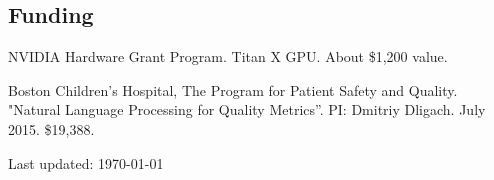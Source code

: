 \documentclass[letterpaper]{article}
\renewenvironment{itemize}{
  \begin{list}{}{
    \setlength{\leftmargin}{1.5em}
  }
}{
  \end{list}
}
\begin{document}
\subsection*{Funding}
\begin{itemize}
\item NVIDIA Hardware Grant Program. Titan X GPU. About \$1,200 value.
\item Boston Children's Hospital, The Program for Patient Safety and Quality. "Natural Language Processing for Quality Metrics''. PI: Dmitriy Dligach. July 2015. \$19,388.
\end{itemize}


\bigskip

\begin{center}
\begin{footnotesize}
Last updated: \today \\
\end{footnotesize}
\end{center}
\end{document}
